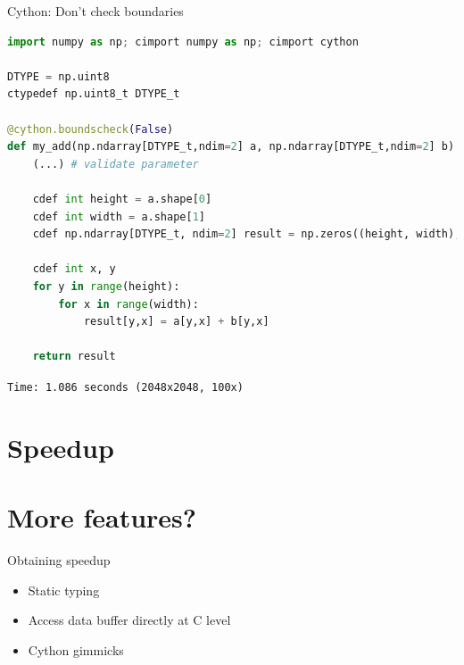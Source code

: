 \documentclass[dvipsnames]{beamer}
\begin{document}
\begin{frame}[fragile]{Cython: Don't check boundaries}
\begin{lstlisting}[language=Python,caption={add5.pyx}]
import numpy as np; cimport numpy as np; cimport cython

DTYPE = np.uint8
ctypedef np.uint8_t DTYPE_t

@cython.boundscheck(False)
def my_add(np.ndarray[DTYPE_t,ndim=2] a, np.ndarray[DTYPE_t,ndim=2] b):
    (...) # validate parameter

    cdef int height = a.shape[0]
    cdef int width = a.shape[1]
    cdef np.ndarray[DTYPE_t, ndim=2] result = np.zeros((height, width), dtype=DTYPE)

    cdef int x, y
    for y in range(height):
        for x in range(width):
            result[y,x] = a[y,x] + b[y,x]

    return result
\end{lstlisting}
\pause
\vspace{-0.3cm}
{\tt Time: 1.086 seconds (2048x2048, 100x)}
\end{frame}

\section{Speedup}

\section{More features?}

\begin{frame}{Obtaining speedup}
\begin{itemize}
\item Static typing
\item Access data buffer directly at C level
\item Cython gimmicks
\end{itemize}
\end{frame}
\end{document}
